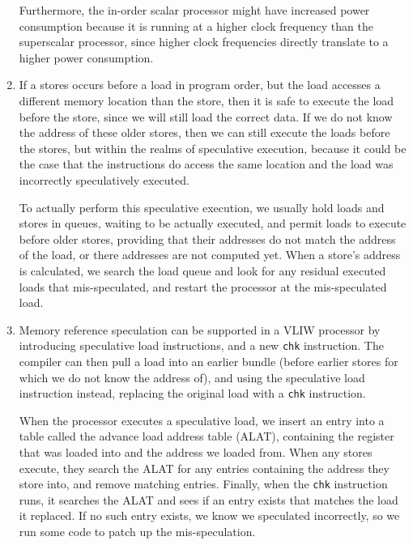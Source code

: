 \begin{enumerate}[label=(\alph*)]
    Furthermore, the in-order scalar processor might have increased power consumption because it is running at a higher clock frequency than the superscalar processor, since higher clock frequencies directly translate to a higher power consumption.


  \item

    If a stores occurs before a load in program order, but the load accesses a different memory location than the store, then it is safe to execute the load before the store, since we will still load the correct data. If we do not know the address of these older stores, then we can still execute the loads before the stores, but within the realms of speculative execution, because it could be the case that the instructions do access the same location and the load was incorrectly speculatively executed.

    To actually perform this speculative execution, we usually hold loads and stores in queues, waiting to be actually executed, and permit loads to execute before older stores, providing that their addresses do not match the address of the load, or there addresses are not computed yet. When a store's address is calculated, we search the load queue and look for any residual executed loads that mis-speculated, and restart the processor at the mis-speculated load.

  \item
    Memory reference speculation can be supported in a VLIW processor by introducing speculative load instructions, and a new \texttt{chk} instruction. The compiler can then pull a load into an earlier bundle (before earlier stores for which we do not know the address of), and using the speculative load instruction instead, replacing the original load with a \texttt{chk} instruction.

    When the processor executes a speculative load, we insert an entry into a table called the advance load address table (ALAT), containing the register that was loaded into and the address we loaded from. When any stores execute, they search the ALAT for any entries containing the address they store into, and remove matching entries. Finally, when the \texttt{chk} instruction runs, it searches the ALAT and sees if an entry exists that matches the load it replaced. If no such entry exists, we know we speculated incorrectly, so we run some code to patch up the mis-speculation.







    
\end{enumerate}

